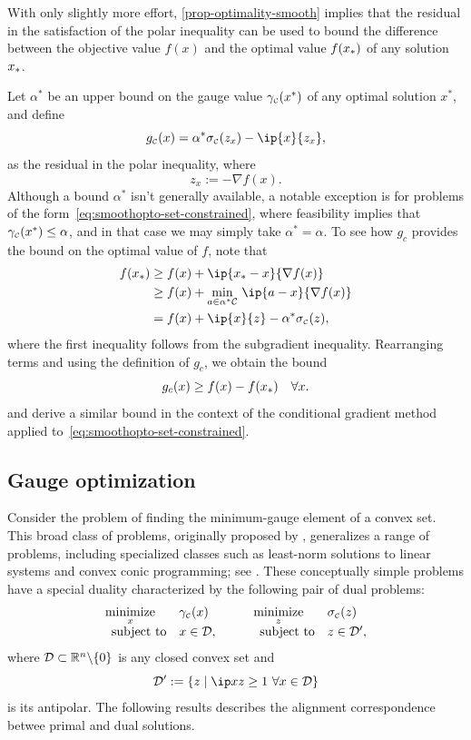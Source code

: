 With only slightly more effort, \autoref{prop-optimality-smooth} implies that the
residual in the satisfaction of the polar inequality can be used to bound the
difference between the objective value $f(x)$ and the optimal value $f(x_*)$
of any solution $x_*$.

Let $\alpha^*$ be an upper bound on the gauge value
$\gamma_{\scriptscriptstyle\mathcal{C}}(x^*)$ of any optimal solution $x^*$, and define
\[
  g\Cs(x) = \alpha^*\sigma\Cs(z_x) - \ip{x}{z_x}, 
\]
as the residual in the polar inequality, where
\[
  z_x := -\nabla f(x).
\]
Although a bound $\alpha^*$ isn't generally available, a notable exception is
for problems of the form~\eqref{eq:smoothopto-set-constrained}, where
feasibility implies that $\gamma_{\scriptscriptstyle\mathcal{C}}(x^*)\le\alpha$, and in that case we may
simply take $\alpha^*=\alpha$. To see how $g_c$ provides the bound on the
optimal value of $f$, note that
\begin{align*}
  f(\xstar) &\ge f(x) + \ip{\xstar-x}{\nabla f(x)}
          \\&\ge f(x) + \min_{a\in\alpha^*\Cscr}\, \ip{a-x}{\nabla f(x)} 
          \\&= f(x) + \ip{x}{z} - \alpha^*\sigma\Cs(z),
\end{align*}
where the first inequality follows from the subgradient inequality.
Rearranging terms and using the definition of $g_c$, we obtain the bound
\[
 g_c(x) \ge f(x)-f(x_*) \quad\forall x. 
\]
\citet{jaggi2013revisiting} and \citet{ndiaye2016gap} derive a similar bound in
the context of the conditional gradient method applied
to~\eqref{eq:smoothopto-set-constrained}. 

\subsection{Gauge optimization}\label{sec:gauge-optimization}

Consider the problem of finding the minimum-gauge element of a convex set. This
broad class of problems, originally proposed by \citet{freund1987dual},
generalizes a range of problems, including specialized classes such as least-norm
solutions to linear systems and convex conic programming; see
\citet{friedlander2014gauge,aravkin2018foundations}. These conceptually simple
problems have a special duality characterized by the following pair of dual
problems:
\begin{equation}   \label{eq:gaugeduality}
  \begin{array}{l@{\enspace}l}
    \minimize{x} & \gauge\Cs(x)\\ 
    \st & x\in \Dscr,
  \end{array}
  \qquad
  \begin{array}{l@{\enspace}l}
    \minimize{z} & \sigma\Cs(z)\\
    \st & z\in \Dscr',
  \end{array}
\end{equation}
where $\mathcal{D}\subset\mathbb{R}^n\backslash\{0\}$ is any closed convex set and
\[\Dscr':=\{z \mid \ip x z \ge 1\ \forall x\in\Dscr\}\] is its antipolar.
The following results describes the alignment correspondence betwee primal and
dual solutions.

